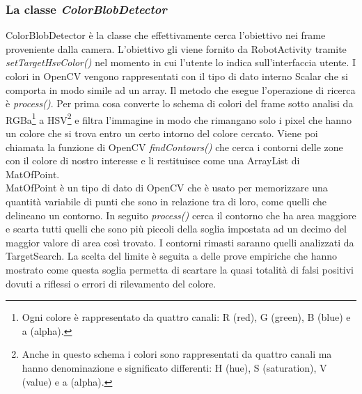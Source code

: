 \subsubsection{La classe \emph{ColorBlobDetector}}
ColorBlobDetector è la classe che effettivamente cerca l'obiettivo nei
frame proveniente dalla camera. L'obiettivo gli viene fornito da RobotActivity 
tramite \emph{setTargetHsvColor()} nel momento in cui l'utente lo indica 
sull'interfaccia utente. I colori in OpenCV vengono rappresentati con il tipo di dato interno
Scalar che si comporta in modo simile ad un array. Il metodo che esegue 
l'operazione di ricerca è \emph{process()}. Per prima cosa converte lo schema di 
colori del frame sotto analisi da RGBa\footnote{Ogni colore è rappresentato da 
quattro canali: R (red), G (green), B (blue) e a (alpha).} a HSV\footnote{Anche in questo
schema i colori sono rappresentati da quattro canali ma hanno denominazione e 
significato differenti: H (hue), S (saturation), V (value) e  a (alpha).} e filtra l'immagine in modo che rimangano solo 
i pixel che hanno un colore che si trova entro un certo intorno del colore cercato.
Viene poi chiamata la funzione di OpenCV \emph{findContours()} che cerca i contorni delle
zone con il colore di nostro interesse e li restituisce come una ArrayList di MatOfPoint.\\
MatOfPoint è un tipo di dato di OpenCV che è usato per memorizzare una quantità variabile
di punti che sono in relazione tra di loro, come quelli che delineano un contorno.
In seguito \emph{process()} cerca il contorno che ha area maggiore e scarta tutti quelli che sono più piccoli 
della soglia impostata ad un decimo del maggior valore di area così trovato. I contorni rimasti 
saranno quelli analizzati da TargetSearch. La scelta del limite è 
seguita a delle prove empiriche che hanno mostrato come questa soglia permetta di
scartare la quasi totalità di falsi positivi dovuti a riflessi o errori di 
rilevamento del colore. 

